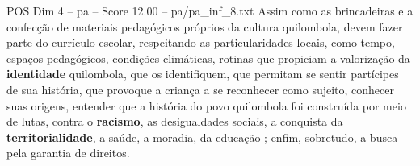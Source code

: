 \begin{textsample}{POS Dim 4 – pa – Score 12.00 – pa/pa\_inf\_8.txt}
Assim como as brincadeiras e a confecção de materiais pedagógicos próprios da cultura quilombola, devem fazer parte do currículo escolar, respeitando as particularidades locais, como tempo, espaços pedagógicos, condições climáticas, rotinas que propiciam a valorização da \textbf{identidade} quilombola, que os identifiquem, que permitam se sentir partícipes de sua história, que provoque a criança a se reconhecer como sujeito, conhecer suas origens, entender que a história do povo quilombola foi construída por meio de lutas, contra o \textbf{racismo}, as desigualdades sociais, a conquista da \textbf{territorialidade}, a saúde, a moradia, da educação ; enfim, sobretudo, a busca pela garantia de direitos.

\end{textsample}

